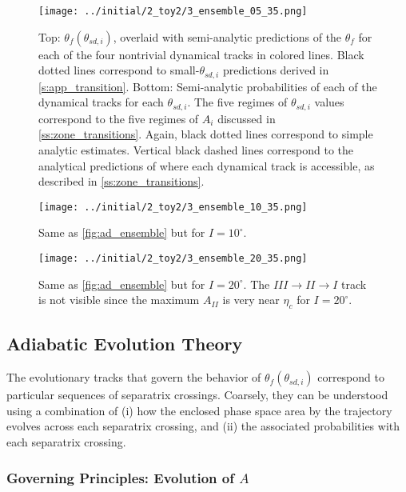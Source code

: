 \documentclass[
        fleqn,
        usenatbib,
    ]{mnras}
\newcommand*{\p}[1]{\left(#1\right)}
\begin{document}
\begin{figure}
    \centering
    \texttt{[image: ../initial/2\_toy2/3\_ensemble\_05\_35.png]}
    \caption{Top: $\theta_{f}\p{\theta_{sd, i}}$, overlaid with semi-analytic
    predictions of the $\theta_{ f}$ for each of the four nontrivial
    dynamical tracks in colored lines. Black dotted lines correspond to
    small-$\theta_{sd, i}$ predictions derived in \autoref{s:app_transition}.
    Bottom: Semi-analytic probabilities of each of the dynamical tracks for each
    $\theta_{sd, i}$. The five regimes of $\theta_{sd, i}$ values correspond to
    the five regimes of $A_i$ discussed in \autoref{ss:zone_transitions}. Again,
    black dotted lines correspond to simple analytic estimates. Vertical black
    dashed lines correspond to the analytical predictions of where each
    dynamical track is accessible, as described in
    \autoref{ss:zone_transitions}.}\label{fig:ad_ensemble}
\end{figure}
\begin{figure}
    \centering
    \texttt{[image: ../initial/2\_toy2/3\_ensemble\_10\_35.png]}
    \caption{Same as \autoref{fig:ad_ensemble} but for $I =
    10^\circ$.}\label{fig:3_ensemble_10_35}
\end{figure}
\begin{figure}
    \texttt{[image: ../initial/2\_toy2/3\_ensemble\_20\_35.png]}
    \caption{Same as \autoref{fig:ad_ensemble} but for $I = 20^\circ$. The $III
    \to II \to I$ track is not visible since the maximum $A_{II}$ is very near
    $\eta_c$ for $I = 20^\circ$.}\label{fig:3_ensemble_20_35}
\end{figure}

\subsection{Adiabatic Evolution Theory}\label{ss:zone_transitions}

The evolutionary tracks that govern the behavior of $\theta_f\p{\theta_{sd,
i}}$ correspond to particular sequences of separatrix crossings. Coarsely, they
can be understood using a combination of (i) how the enclosed phase space area
by the trajectory evolves across each separatrix crossing, and (ii) the
associated probabilities with each separatrix crossing.

\subsubsection{Governing Principles: Evolution of $A$}\label{sss:a_evo}
\end{document}
